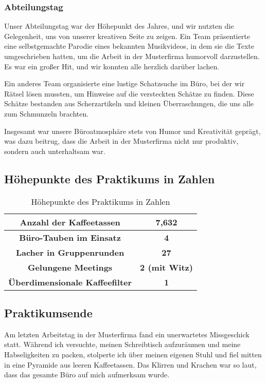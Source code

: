 \subsubsection{Abteilungstag}

Unser Abteilungstag war der Höhepunkt des Jahres, und wir nutzten die Gelegenheit, uns von unserer kreativen Seite zu zeigen. Ein Team präsentierte eine selbstgemachte Parodie eines bekannten Musikvideos, in dem sie die Texte umgeschrieben hatten, um die Arbeit in der Musterfirma humorvoll darzustellen. Es war ein großer Hit, und wir konnten alle herzlich darüber lachen.

Ein anderes Team organisierte eine lustige Schatzsuche im Büro, bei der wir Rätsel lösen mussten, um Hinweise auf die versteckten Schätze zu finden. Diese Schätze bestanden aus Scherzartikeln und kleinen Überraschungen, die uns alle zum Schmunzeln brachten.

Insgesamt war unsere Büroatmosphäre stets von Humor und Kreativität geprägt, was dazu beitrug, dass die Arbeit in der Musterfirma nicht nur produktiv, sondern auch unterhaltsam war.

\subsection{Höhepunkte des Praktikums in Zahlen}

\begin{table}[h]
  \centering
  \begin{tabular}{|c|c|}
    \hline
    \textbf{Anzahl der Kaffeetassen} & \textbf{7,632} \\
    \hline
    \textbf{Büro-Tauben im Einsatz} & \textbf{4} \\
    \hline
    \textbf{Lacher in Gruppenrunden} & \textbf{27} \\
    \hline
    \textbf{Gelungene Meetings} & \textbf{2 (mit Witz)} \\
    \hline
    \textbf{Überdimensionale Kaffeefilter} & \textbf{1} \\
    \hline
  \end{tabular}
  \caption{Höhepunkte des Praktikums in Zahlen}
  \label{tab:hohepunkte}
\end{table}

\subsection{Praktikumsende}
Am letzten Arbeitstag in der Musterfirma fand ein unerwartetes Missgeschick statt. Während ich versuchte, meinen Schreibtisch aufzuräumen und meine Habseligkeiten zu packen, stolperte ich über meinen eigenen Stuhl und fiel mitten in eine Pyramide aus leeren Kaffeetassen. Das Klirren und Krachen war so laut, dass das gesamte Büro auf mich aufmerksam wurde.

